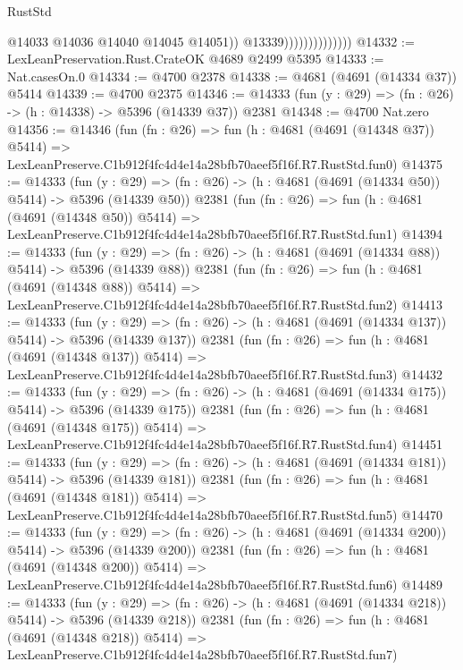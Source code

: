 \begin{lexlean}{RustStd}
\begin{coremodule}
                                    @14033
                                    @14036
                                    @14040
                                    @14045
                                    @14051))
                                @13339))))))))))))))
@14332 := LexLeanPreservation.Rust.CrateOK @4689 @2499 @5395
@14333 := Nat.casesOn.{0}
@14334 := @4700 @2378
@14338 := @4681 (@4691 (@14334 @37)) @5414
@14339 := @4700 @2375
@14346 := @14333 (fun (y : @29) => (fn : @26) -> (h : @14338) -> @5396 (@14339 @37)) @2381
@14348 := @4700 Nat.zero
@14356 := @14346
    (fun (fn : @26) =>
    fun (h : @4681 (@4691 (@14348 @37)) @5414) =>
    LexLeanPreserve.C1b912f4fc4d4e14a28bfb70aeef5f16f.R7.RustStd.fun0)
@14375 := @14333
    (fun (y : @29) => (fn : @26) -> (h : @4681 (@4691 (@14334 @50)) @5414) -> @5396 (@14339 @50))
    @2381
    (fun (fn : @26) =>
    fun (h : @4681 (@4691 (@14348 @50)) @5414) =>
    LexLeanPreserve.C1b912f4fc4d4e14a28bfb70aeef5f16f.R7.RustStd.fun1)
@14394 := @14333
    (fun (y : @29) => (fn : @26) -> (h : @4681 (@4691 (@14334 @88)) @5414) -> @5396 (@14339 @88))
    @2381
    (fun (fn : @26) =>
    fun (h : @4681 (@4691 (@14348 @88)) @5414) =>
    LexLeanPreserve.C1b912f4fc4d4e14a28bfb70aeef5f16f.R7.RustStd.fun2)
@14413 := @14333
    (fun (y : @29) => (fn : @26) -> (h : @4681 (@4691 (@14334 @137)) @5414) -> @5396 (@14339 @137))
    @2381
    (fun (fn : @26) =>
    fun (h : @4681 (@4691 (@14348 @137)) @5414) =>
    LexLeanPreserve.C1b912f4fc4d4e14a28bfb70aeef5f16f.R7.RustStd.fun3)
@14432 := @14333
    (fun (y : @29) => (fn : @26) -> (h : @4681 (@4691 (@14334 @175)) @5414) -> @5396 (@14339 @175))
    @2381
    (fun (fn : @26) =>
    fun (h : @4681 (@4691 (@14348 @175)) @5414) =>
    LexLeanPreserve.C1b912f4fc4d4e14a28bfb70aeef5f16f.R7.RustStd.fun4)
@14451 := @14333
    (fun (y : @29) => (fn : @26) -> (h : @4681 (@4691 (@14334 @181)) @5414) -> @5396 (@14339 @181))
    @2381
    (fun (fn : @26) =>
    fun (h : @4681 (@4691 (@14348 @181)) @5414) =>
    LexLeanPreserve.C1b912f4fc4d4e14a28bfb70aeef5f16f.R7.RustStd.fun5)
@14470 := @14333
    (fun (y : @29) => (fn : @26) -> (h : @4681 (@4691 (@14334 @200)) @5414) -> @5396 (@14339 @200))
    @2381
    (fun (fn : @26) =>
    fun (h : @4681 (@4691 (@14348 @200)) @5414) =>
    LexLeanPreserve.C1b912f4fc4d4e14a28bfb70aeef5f16f.R7.RustStd.fun6)
@14489 := @14333
    (fun (y : @29) => (fn : @26) -> (h : @4681 (@4691 (@14334 @218)) @5414) -> @5396 (@14339 @218))
    @2381
    (fun (fn : @26) =>
    fun (h : @4681 (@4691 (@14348 @218)) @5414) =>
    LexLeanPreserve.C1b912f4fc4d4e14a28bfb70aeef5f16f.R7.RustStd.fun7)

\end{coremodule}
\end{lexlean}
